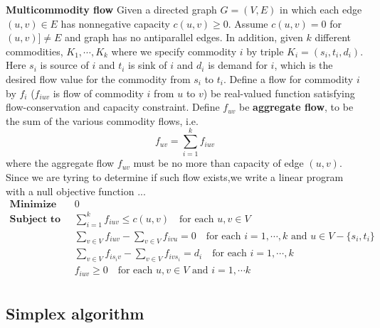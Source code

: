 \documentclass[11pt]{article}
\begin{document}
\begin{defn*}
    \textbf{Multicommodity flow} Given a directed graph $G = (V,E)$ in which each edge $(u,v)\in E$ has nonnegative capacity $c(u,v) \geq 0$. Assume $c(u,v) = 0$ for $(u,v)]\neq E$ and graph has no antiparallel edges. In addition, given $k$ different commodities, $K_1, \cdots, K_k$ where we specify commodity $i$ by triple $K_i = (s_i, t_i, d_i)$. Here $s_i$ is source of $i$ and $t_i$ is sink of $i$ and $d_i$ is demand for $i$, which is the desired flow value for the commodity from $s_i$ to $t_i$. Define a flow for commodity $i$ by $f_i$ ($f_{iuv}$ is flow of commodity $i$ from $u$ to $v$) be real-valued function satisfying flow-conservation and capacity constraint. Define $f_{uv}$ be \textbf{aggregate flow}, to be the sum of the various commodity flows, i.e. 
    \[
        f_{uv} = \sum_{i=1}^k f_{iuv}
    \]
    where the aggregate flow $f_{uv}$ must be no more than capacity of edge $(u,v)$. Since we are tyring to determine if such flow exists,we write a linear program with a null objective function ... 
    \begin{align*}
        \textbf{Minimize} \quad & 0\\
        \textbf{Subject to} \quad & \sum_{i=1}^k f_{iuv} \leq c(u,v) \quad \text{for each } u,v\in V\\
                                & \sum_{v\in V} f_{iuv} - \sum_{v\in V} f_{ivu} = 0 \quad \text{for each } i = 1,\cdots, k \text{ and } u\in V - \{ s_i, t_i\}\\
                                &  \sum_{v\in V} f_{is_iv} - \sum_{v\in V} f_{ivs_i} = d_i \quad \text{for each } i = 1, \cdots, k \\
                                & f_{iuv}\geq 0 \quad \text{for each } u,v\in V \text{ and } i = 1,\cdots k\\
    \end{align*}
\end{defn*}





\subsection*{Simplex algorithm} 
\end{document}
